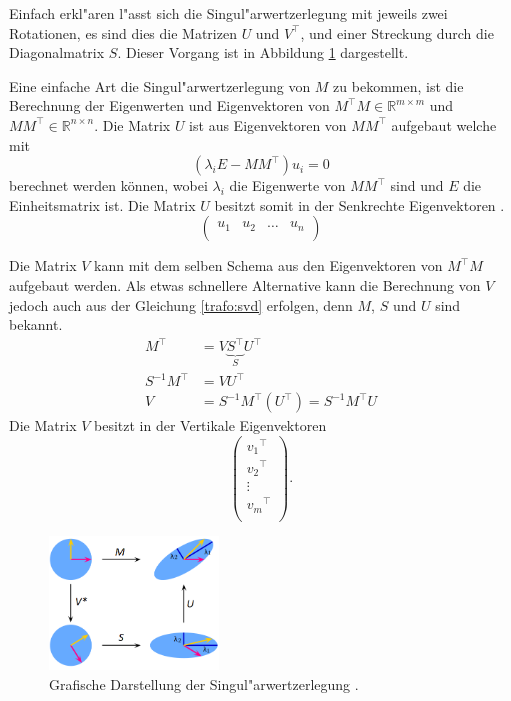 \begin{refsection}
Einfach erkl"aren l"asst sich die Singul"arwertzerlegung mit jeweils zwei Rotationen, es sind dies die Matrizen $U$ und $V^\top$, und einer Streckung durch die Diagonalmatrix $S$. Dieser Vorgang ist in Abbildung \ref{trafo:SVDFig} dargestellt. 

Eine einfache Art die Singul"arwertzerlegung von $M$ zu bekommen, ist die Berechnung der Eigenwerten und Eigenvektoren von $M^\top M \in \mathbb{R}^{m \times m}$ und $MM^\top \in \mathbb{R}^{n \times n}$. Die Matrix $U$ ist aus Eigenvektoren von $MM^\top$ aufgebaut welche mit
\begin{equation*}
	\left(\lambda_i E - MM^\top\right)u_i = 0
\end{equation*}
berechnet werden können, wobei $\lambda_i$ die Eigenwerte von $MM^\top$ sind und $E$ die Einheitsmatrix ist. Die Matrix $U$ besitzt somit in der Senkrechte Eigenvektoren \cite{trafo:Watkins}.
\begin{equation*}
	\left( 
		\begin{array}{cccc}
		u_1 & u_2 & \dots & u_n  \\		
		\end{array}
	\right)
\end{equation*}

Die Matrix $V$ kann mit dem selben Schema aus den Eigenvektoren von $M^\top M$ aufgebaut werden. Als etwas schnellere Alternative kann die Berechnung von $V$ jedoch auch aus der Gleichung \ref{trafo:svd} erfolgen, denn $M$, $S$ und $U$ sind bekannt. 
\begin{align*}
	M^\top &= V \underbrace{S^\top}_{S} U^\top\\
	S^{-1} M^\top &= V U^\top\\
	V &= S^{-1} M^\top \left(U^\top\right) = S^{-1} M^\top U
\end{align*}
Die Matrix $V$ besitzt in der Vertikale Eigenvektoren  \cite{trafo:Watkins}
\begin{equation*}
	\left( 
		\begin{array}{c}
		{v_1}^{\top}\\
		{v_2}^{\top}\\
		\vdots\\
		{v_m}^{\top}\\			
		\end{array}
	\right).
\end{equation*}

\begin{figure}
	\centering
	\includegraphics[width=0.4\textwidth]{./trafo/images/svd.png}
	\caption{Grafische Darstellung der Singul"arwertzerlegung \cite{trafo:SVDWiki}.}
	\label{trafo:SVDFig}
\end{figure}


\end{refsection}
